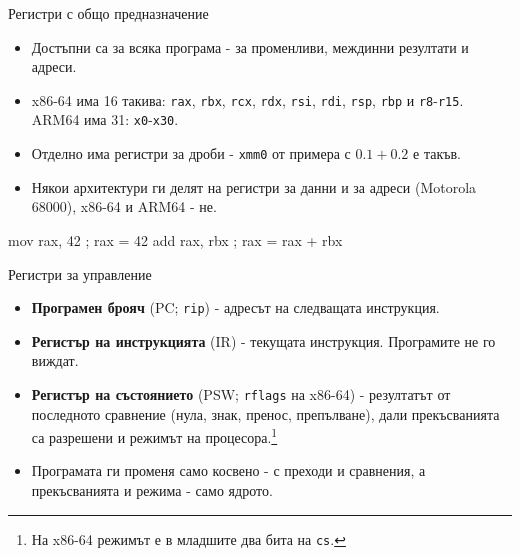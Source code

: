 \documentclass[14pt, aspectratio=169]{beamer}
\begin{document}
\begin{frame}[fragile]{Регистри с общо предназначение}
  \begin{itemize}
    \item Достъпни са за всяка програма - за променливи, междинни резултати
      и адреси.
    \item x86-64 има 16 такива: \texttt{rax}, \texttt{rbx}, \texttt{rcx},
      \texttt{rdx}, \texttt{rsi}, \texttt{rdi}, \texttt{rsp}, \texttt{rbp} и
      \texttt{r8}-\texttt{r15}. ARM64 има 31: \texttt{x0}-\texttt{x30}.
    \item Отделно има регистри за дроби - \texttt{xmm0} от примера с
      $0.1 + 0.2$ е такъв.
    \item Някои архитектури ги делят на регистри за данни и за адреси
      (Motorola 68000), x86-64 и ARM64 - не.
  \end{itemize}
\begin{semiverbatim}\small
    mov rax, 42      ; rax = 42
    add rax, rbx     ; rax = rax + rbx
\end{semiverbatim}
\end{frame}

\begin{frame}{Регистри за управление}
  \begin{itemize}
    \item \textbf{Програмен брояч} (PC; \texttt{rip}) - адресът на следващата
      инструкция.
    \item \textbf{Регистър на инструкцията} (IR) - текущата инструкция.
      Програмите не го виждат.
    \item \textbf{Регистър на състоянието} (PSW; \texttt{rflags} на x86-64) -
      резултатът от последното сравнение (нула, знак, пренос, препълване),
      дали прекъсванията са разрешени и режимът на
      процесора.\footnote{На x86-64 режимът е в младшите два бита на
        \texttt{cs}.}
    \item Програмата ги променя само косвено - с преходи и сравнения, а
      прекъсванията и режима - само ядрото.
  \end{itemize}
\end{frame}
\end{document}
